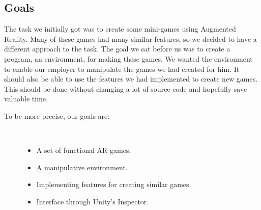 \subsection{Goals}
\label{subsec:goals}
The task we initially got was to create some mini-games using \gls{Augmented Reality}. Many of these games had many similar features, so we decided to have a different approach to the task. The goal we sat before us was to create a program, an environment, for making these games. We wanted the environment to enable our employer to manipulate the games we had created for him. It should also be able to use the features we had implemented to create new games. This should be done without changing a lot of source code and hopefully save valuable time.


\begin{description}
	\item[To be more precise, our goals are:]\ 
	\begin{itemize}
		\item A set of functional \gls{AR} games.
		\item A manipulative environment.
		\item Implementing features for creating similar games. 
		\item Interface through Unity's \gls{Inspector}.
	\end{itemize}
\end{description}



